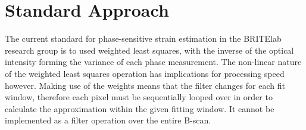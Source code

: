\section{Standard Approach}
The current standard for phase-sensitive strain estimation in the BRITElab research group is to used weighted least squares, with the inverse of the optical intensity forming the variance of each phase measurement. The non-linear nature of the weighted least squares operation has implications for processing speed however. Making use of the weights means that the filter changes for each fit window, therefore each pixel must be sequentially looped over in order to calculate the approximation within the given fitting window. It cannot be implemented as a filter operation over the entire B-scan.

